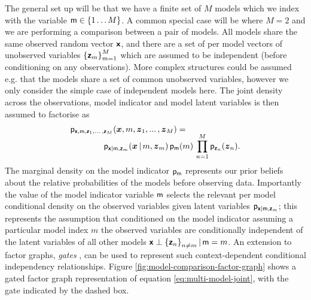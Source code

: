 The general set up will be that we have a finite set of $M$ models which we index with the variable $\rvar{m} \in \fset{1 \dots M}$. A common special case will be where $M=2$ and we are performing a comparison between a pair of models. All models share the same observed random vector $\boldsymbol{\mathsf{x}}$, and there are a set of per model vectors of unobserved variables $\fset{\rvct{z}_m}_{m=1}^M$ which are assumed to be independent  (before conditioning on any observations). More complex structures could be assumed e.g. that the models share a set of common unobserved variables, however we only consider the simple case of independent models here. The joint density across the observations, model indicator and model latent variables is then assumed to factorise as
\begin{equation}\label{eq:multi-model-joint}
\begin{split}
  &\mathsf{p}_{\boldsymbol{\mathsf{x}},\mathsf{m},\boldsymbol{\mathsf{z}}_1,...\, ,\boldsymbol{\mathsf{z}}_M}
  (\boldsymbol{x},m,\boldsymbol{z}_1,...\, ,\boldsymbol{z}_M) =\\[-2mm]
  &\qquad\qquad
  \mathsf{p}_{\boldsymbol{\mathsf{x}}|\mathsf{m},\boldsymbol{\mathsf{z}}_m}(\boldsymbol{x}\operatorname{|} m,\boldsymbol{z}_m)\,
  \mathsf{p}_{\mathsf{m}}(m)\,
  \prod_{n=1}^M \mathsf{p}_{\boldsymbol{\mathsf{z}}_n}(\boldsymbol{z}_n).
\end{split}
\end{equation}
The marginal density on the model indicator $\mathsf{p}_{\mathsf{m}}$ represents our prior beliefs about the relative probabilities of the models before observing data. Importantly the value of the model indicator variable $\mathsf{m}$ selects the relevant per model conditional density on the observed variables given latent variables $\mathsf{p}_{\boldsymbol{\mathsf{x}}|\mathsf{m},\boldsymbol{\mathsf{z}}_m}$; this represents the assumption that conditioned on the model indicator assuming a particular model index $m$ the observed variables are conditionally independent of the latent variables of all other models $\rvct{x} \perp \fset{\rvct{z}_n}_{n\neq m} \gvn \rvar{m} = m$. An extension to factor graphs, \emph{gates} \citep{minka2009gates}, can be used to represent such context-dependent conditional independency relationships. Figure \ref{fig:model-comparison-factor-graph} shows a gated factor graph representation of equation \ref{eq:multi-model-joint}, with the gate indicated by the dashed box. %

